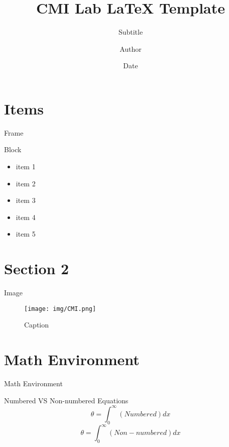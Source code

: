 \documentclass{CMI-beamer}
\title[Hanging Title]{CMI Lab LaTeX Template}
\subtitle{Subtitle}
\author{Author}
\institute[CU]{
  Department\\
  Clarkson University
}
\date{Date}
\begin{document}
\maketitle

\section{Items}

\begin{frame}{Frame}
\begin{block}{Block}
\begin{itemize}
    \item item 1
    \item item 2
    \item item 3
\end{itemize}
\end{block}
\begin{itemize}
    \item item 4
    \item item 5
\end{itemize}

\end{frame}


\section{Section 2}

\begin{frame}{Image}
    \begin{figure}
        \centering
        \texttt{[image: img/CMI.png]}
        \caption{Caption}

    \end{figure}
\end{frame}

\section{Math Environment}

\begin{frame}{Math Environment}

\begin{block}{Numbered VS Non-numbered Equations}
\begin{equation}
    \theta = \int_0^{\infty}(Numbered)dx
\end{equation}
\begin{equation*}
    \theta = \int_0^{\infty}(Non-numbered)dx
\end{equation*}
\end{block}

\end{frame}
\end{document}
